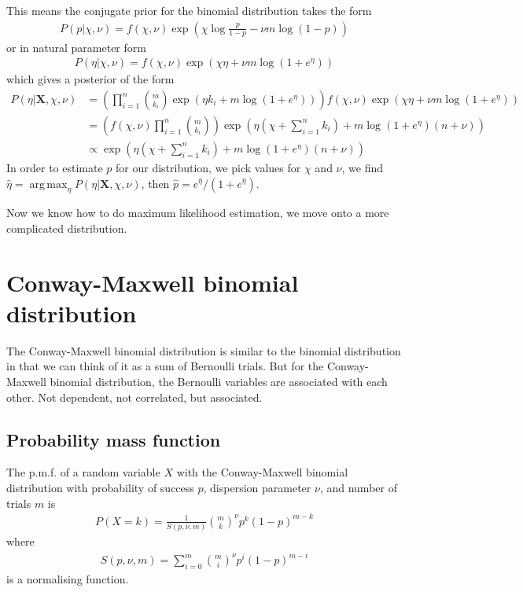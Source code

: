 \documentclass[a4paper,12pt]{article}
\theoremstyle{definition}
\DeclareMathOperator*{\argmax}{arg\,max} %
\begin{document}
This means the conjugate prior for the binomial distribution takes the form
\begin{align}
  P(p | \chi, \nu) = f(\chi, \nu) \exp \left( \chi \log \frac{p}{1-p} - \nu m \log (1 - p)  \right)
\end{align}
or in natural parameter form
\begin{align}
  P(\eta | \chi, \nu) = f(\chi, \nu) \exp \left( \chi \eta + \nu m \log (1 + e^{\eta}) \right)
\end{align}
which gives a posterior of the form
\begin{align}
  P(\eta | \mathbf{X}, \chi, \nu) & = \left( \prod_{i=1}^n \binom{m}{k_i} \exp \left( \eta k_i  + m \log (1 + e^{\eta})  \right) \right) f(\chi, \nu) \exp \left( \chi \eta + \nu m \log (1 + e^{\eta})  \right) \\
  & = \left( f(\chi, \nu) \prod_{i=1}^n \binom{m}{k_i} \right) \exp \left( \eta (\chi + \sum_{i=1}^{n} k_i) + m \log ( 1 + e^{\eta})(n + \nu) \right) \\
  & \propto \exp \left( \eta (\chi + \sum_{i=1}^{n} k_i) + m \log ( 1 + e^{\eta})(n + \nu) \right)
\end{align}
In order to estimate $p$ for our distribution, we pick values for $\chi$ and $\nu$, we find $\hat{\eta} = \argmax_{\eta} P(\eta | \mathbf{X}, \chi, \nu)$, then $\hat{p} = e^{\hat{\eta}}/(1 + e^{\hat{\eta}})$.


Now we know how to do maximum likelihood estimation, we move onto a more complicated distribution.

\section{Conway-Maxwell binomial distribution}
The Conway-Maxwell binomial distribution is similar to the binomial distribution in that we can think of it as a sum of Bernoulli trials. But for the Conway-Maxwell binomial distribution, the Bernoulli variables are associated with each other. Not dependent, not correlated, but associated. 

\subsection{Probability mass function}
The p.m.f. of a random variable $X$ with the Conway-Maxwell binomial distribution with probability of success $p$, dispersion parameter $\nu$, and number of trials $m$ is
\begin{align}
  P(X = k) = \frac{1}{S(p, \nu, m)} \binom{m}{k}^{\nu} p^{k} (1-p)^{m-k}
\end{align}
where 
\begin{align}
  S(p, \nu, m) = \sum_{i=0}^{m} \binom{m}{i}^{\nu} p^{i} (1-p)^{m-i}
\end{align}
is a normalising function. 
\end{document}
